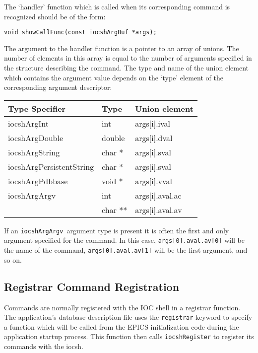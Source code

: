 The `handler' function which is called when its corresponding command is recognized should be of the form:

\begin{verbatim}
void showCallFunc(const iocshArgBuf *args);
\end{verbatim}

The argument to the handler function is a pointer to an array of unions.
The number of elements in this array is equal to the number of arguments specified in the structure describing the command.
The type and name of the union element which contains the argument value depends on the `type' element of the corresponding argument descriptor:

\begin{center}
\begin{longtable}
{p{1.45833in}p{0.56in}p{1.19in}}
Type Specifier & Type & Union element\\
\hline
iocshArgInt & int & args[i].ival\\
iocshArgDouble & double & args[i].dval\\
iocshArgString  & char * & args[i].sval\\
iocshArgPersistentString & char * & args[i].sval\\
iocshArgPdbbase & void * & args[i].vval\\
iocshArgArgv & int & args[i].aval.ac \\
 & char ** & args[i].aval.av
\end{longtable}
\end{center}

If an \verb|iocshArgArgv |argument type is present it is often the first and only argument specified for the command.
In this case, \verb|args[0].aval.av[0]| will be the name of the command, \verb|args[0].aval.av[1]| will be the first argument, and so on.

\subsection{Registrar Command Registration}

Commands are normally registered with the IOC shell in a registrar function.
The application's database description file uses the \verb|registrar| keyword to specify a function which will be called from the EPICS initialization code during the application startup process.
This function then calls \verb|iocshRegister| to register its commands with the iocsh.

